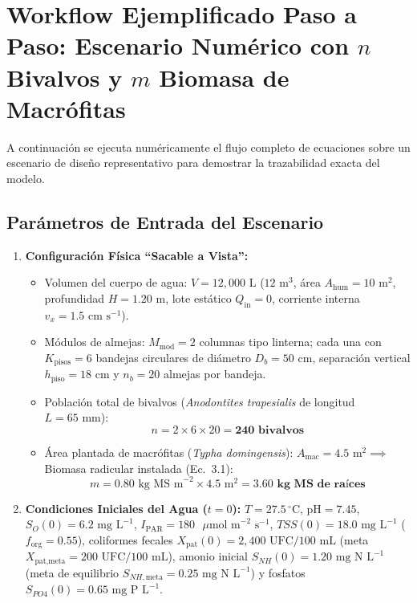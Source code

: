 \documentclass[11pt,letterpaper]{article}
\begin{document}
\section{Workflow Ejemplificado Paso a Paso: Escenario Numérico con $n$ Bivalvos y $m$ Biomasa de Macrófitas}

A continuación se ejecuta numéricamente el flujo completo de ecuaciones sobre un escenario de diseño representativo para demostrar la trazabilidad exacta del modelo.

\subsection{Parámetros de Entrada del Escenario}
\begin{enumerate}[leftmargin=1.5em]
    \item \textbf{Configuración Física ``Sacable a Vista'':}
    \begin{itemize}
        \item Volumen del cuerpo de agua: $V = 12,000\text{ L}$ ($12\text{ m}^3$, área $A_{\text{hum}} = 10\text{ m}^2$, profundidad $H = 1.20\text{ m}$, lote estático $Q_{\text{in}} = 0$, corriente interna $v_x = 1.5\text{ cm s}^{-1}$).
        \item Módulos de almejas: $M_{\text{mod}} = 2$ columnas tipo linterna; cada una con $K_{\text{pisos}} = 6$ bandejas circulares de diámetro $D_b = 50\text{ cm}$, separación vertical $h_{\text{piso}} = 18\text{ cm}$ y $n_b = 20$ almejas por bandeja.
        \item Población total de bivalvos (\textit{Anodontites trapesialis} de longitud $L = 65\text{ mm}$):
        \[
            n = 2 \times 6 \times 20 = \mathbf{240\text{ bivalvos}}
        \]
        \item Área plantada de macrófitas (\textit{Typha domingensis}): $A_{\text{mac}} = 4.5\text{ m}^2 \implies$ Biomasa radicular instalada (Ec.\ 3.1):
        \[
            m = 0.80\text{ kg MS m}^{-2} \times 4.5\text{ m}^2 = \mathbf{3.60\text{ kg MS de raíces}}
        \]
    \end{itemize}
    \item \textbf{Condiciones Iniciales del Agua ($t = 0$):}
    $T = 27.5\,^\circ\text{C}$, $\text{pH} = 7.45$, $S_O(0) = 6.2\text{ mg L}^{-1}$, $I_{\text{PAR}} = 180\text{ }\mu\text{mol m}^{-2}\text{ s}^{-1}$, $TSS(0) = 18.0\text{ mg L}^{-1}$ ($f_{\text{org}} = 0.55$), coliformes fecales $X_{\text{pat}}(0) = 2,400\text{ UFC}/100\text{ mL}$ (meta $X_{\text{pat,meta}} = 200\text{ UFC}/100\text{ mL}$), amonio inicial $S_{NH}(0) = 1.20\text{ mg N L}^{-1}$ (meta de equilibrio $S_{NH,\text{meta}} = 0.25\text{ mg N L}^{-1}$) y fosfatos $S_{PO4}(0) = 0.65\text{ mg P L}^{-1}$.
\end{enumerate}
\end{document}
